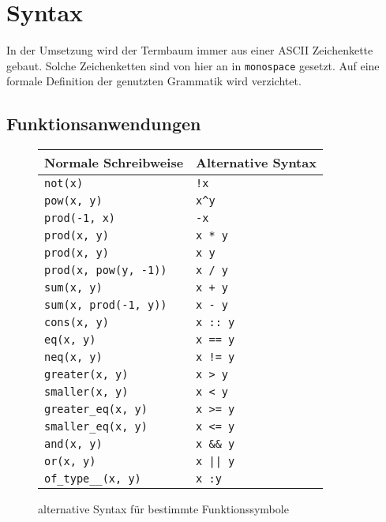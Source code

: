 \section{Syntax} \label{subsecSyntax}
In der Umsetzung wird der Termbaum immer aus einer ASCII Zeichenkette gebaut.
Solche Zeichenketten sind von hier an in \texttt{monospace} gesetzt. Auf eine formale Definition der genutzten Grammatik wird verzichtet.

\subsection{Funktionsanwendungen}
\begin{figure}
    \centering
    \begin{tabular}{l l}
        \hline
        Normale Schreibweise & Alternative Syntax\\
        \hline \hline
        \verb|not(x)|              & \verb|!x|\\
        \verb|pow(x, y)|           & \verb|x^y|\\
        \verb|prod(-1, x)|         & \verb|-x|\\
        \verb|prod(x, y)|          & \verb|x * y|\\
        \verb|prod(x, y)|          & \verb|x y|\\
        \verb|prod(x, pow(y, -1))| & \verb|x / y|\\
        \verb|sum(x, y)|           & \verb|x + y|\\
        \verb|sum(x, prod(-1, y))| & \verb|x - y|\\
        \verb|cons(x, y)|          & \verb|x :: y|\\
        \verb|eq(x, y)|            & \verb|x == y|\\
        \verb|neq(x, y)|           & \verb|x != y|\\
        \verb|greater(x, y)|       & \verb|x > y|\\
        \verb|smaller(x, y)|       & \verb|x < y|\\
        \verb|greater_eq(x, y)|    & \verb|x >= y|\\
        \verb|smaller_eq(x, y)|    & \verb|x <= y|\\
        \verb|and(x, y)|           & \verb|x && y|\\
        \verb|or(x, y)|            & \verb!x || y!\\
        \verb|of_type__(x, y)|     & \verb|x :y|\\
        \hline
    \end{tabular}
    \caption{alternative Syntax für bestimmte Funktionssymbole}
    \label{tabZucker}
\end{figure}

